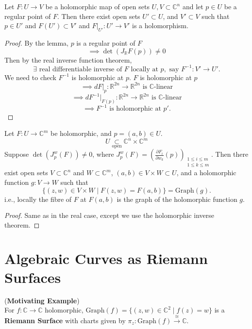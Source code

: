 \documentclass{article}
\begin{document}
\begin{theorem}
Let $F: U \to V$ be a holomorphic map of open sets $U, V \subset \mathbb{C}^n$ and let $p \in U$ be a regular point of $F$. Then there exist open sets $U' \subset U$, and $V' \subset V$ such that $p \in U'$ and $F(U') \subset V'$ and $F|_{U'} : U' \to V'$ is a holomorphism.
\end{theorem}

\begin{proof}
By the lemma, $p$ is a regular point of $F$
$$
\implies \det (J_{\mathbb{R}} F(p)) \ne 0
$$
Then by the real inverse function theorem,
$$
\exists \text{ real differentiable inverse of } F \text{ locally at } p, \text{ say } F^{-1}: V' \to U'.
$$
We need to check $F^{-1}$ is holomorphic at $p$.
$F$ is holomorphic at $p$
$$
\implies dF|_{p} : \mathbb{R}^{2n} \to \mathbb{R}^{2n} \text{ is } \mathbb{C}\text{-linear}
$$
$$
\implies dF^{-1}|_{F(p)} : \mathbb{R}^{2n} \to \mathbb{R}^{2n} \text{ is } \mathbb{C}\text{-linear}
$$
$$
\implies F^{-1} \text{ is holomorphic at } p'.
$$
\end{proof}

\begin{theorem}
Let $F: U \to \mathbb{C}^m$ be holomorphic, and $p = (a, b) \in U$.
$$
U \underset{\text{open}}{\subset} \mathbb{C}^n \times \mathbb{C}^m
$$
Suppose $\det \left( J_p^w (F) \right) \ne 0$, where $J_p^w (F) = \left( \frac{\partial F_i}{\partial w_k} (p) \right)_{\substack{1 \le i \le m \\ 1 \le k \le m}}$.
Then there exist open sets $V \subset \mathbb{C}^n$ and $W \subset \mathbb{C}^m$, $(a, b) \in V \times W \subset U$, and a holomorphic function $g: V \to W$ such that
$$
\{ (z, w) \in V \times W \mid F(z, w) = F(a, b) \} = \text{Graph}(g).
$$
i.e., locally the fibre of $F$ at $F(a, b)$ is the graph of the holomorphic function $g$.
\end{theorem}

\begin{proof}
Same as in the real case, except we use the holomorphic inverse theorem.
\end{proof}

\newpage
\section{Algebraic Curves as Riemann Surfaces}

\begin{example}
(\textbf{Motivating Example}) \\
For $f: \mathbb{C} \to \mathbb{C}$ holomorphic, $\text{Graph}(f) = \{ (z, w) \in \mathbb{C}^2 \mid f(z) = w \}$ is a \textbf{Riemann Surface} with charts given by $\pi_z: \text{Graph}(f) \xrightarrow{\cong} \mathbb{C}$.
\end{example}
\end{document}
